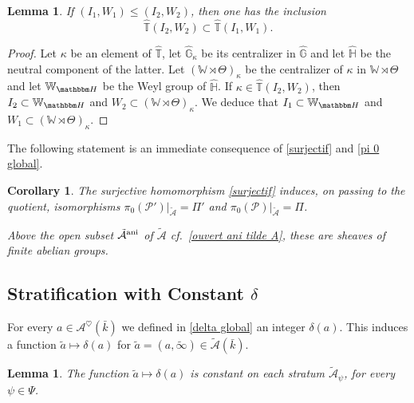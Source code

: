 \documentclass[12pt,english]{smfart}
\numberwithin{equation}{subsection}
\newtheorem{lemma}[equation]{Lemma}
\newtheorem{corollary}[equation]{Corollary}
\theoremstyle{remark}
\newcommand\calA{{\mathscr A}}
\newcommand\HH{{\mathbbm H}}
\newcommand\cf{{\it cf.\ }}
\newcommand\ani{{\rm ani}}
\begin{document}
\begin{lemma}\label{T(I,W) inclusion}
If $(I_1,W_1)\leq (I_2,W_2)$, then one has the inclusion
$$\hat{\mathbb{T}}(I_2,W_2)\subset\hat{\mathbb{T}}(I_1,W_1).$$
\end{lemma}

\begin{proof}
Let $\kappa$ be an element of $\hat{\mathbb{T}}$, let $\hat{\mathbb{G}}_\kappa$ be its centralizer in $\hat{\mathbb{G}}$ and let $\hat{\mathbb{H}}$ be the neutral component of the latter. Let $(\mathbb{W}\rtimes\Theta)_\kappa$ be the centralizer of $\kappa$ in $\mathbb{W}\rtimes\Theta$ and let $\mathbb{W}_\HH$ be the Weyl group of $\hat{\mathbb{H}}$. If $\kappa\in\hat{\mathbb{T}}(I_2,W_2)$, then $I_2\subset\mathbb{W}_\HH$ and $W_2\subset(\mathbb{W}\rtimes\Theta)_\kappa$. We deduce that $I_1\subset\mathbb{W}_\HH$ and $W_1\subset(\mathbb{W}\rtimes\Theta)_\kappa$.
\end{proof}

The following statement is an immediate consequence of \ref{surjectif} and \ref{pi 0 global}.

\begin{corollary}\label{pi}
The surjective homomorphism \ref{surjectif} induces, on passing to the quotient, isomorphisms $\pi_0(\mathcal{P}')|_{\tilde{\mathcal{A}}}=\Pi'$ and $\pi_0(\mathcal{P})|_{\tilde{\mathcal{A}}}=\Pi$.

Above the open subset $\tilde{\mathcal{A}}^\ani$ of $\tilde{\mathcal{A}}$ \cf \ref{ouvert ani tilde A}, these are sheaves of finite abelian groups.
\end{corollary}

\subsection{Stratification with Constant $\delta$}

For every $a\in\mathcal{A}^\heartsuit(\bar k)$ we defined in \ref{delta global} an integer $\delta(a)$. This induces a function $\tilde a\mapsto\delta(a)$ for $\tilde a=(a,\tilde\infty)\in\tilde{\mathcal{A}}(\bar k)$.

\begin{lemma}\label{delta constant sur strate}
The function $\tilde a\mapsto\delta(a)$ is constant on each stratum $\tilde\calA_\psi$, for every $\psi\in\Psi$.
\end{lemma}
\end{document}
